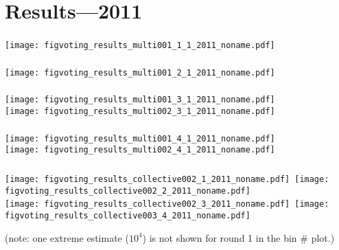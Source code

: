 \section{Results---2011}


\begin{frame}[plain]
  \frametitle{}

  \texttt{[image: figvoting\_results\_multi001\_1\_1\_2011\_noname.pdf]}\\

\end{frame}

\begin{frame}[plain]
  \frametitle{}

  \texttt{[image: figvoting\_results\_multi001\_2\_1\_2011\_noname.pdf]}\\

\end{frame}

\begin{frame}[plain]
  \frametitle{}

  \texttt{[image: figvoting\_results\_multi001\_3\_1\_2011\_noname.pdf]}\\
  \texttt{[image: figvoting\_results\_multi002\_3\_1\_2011\_noname.pdf]}

\end{frame}

\begin{frame}[plain]
  \frametitle{}

  \texttt{[image: figvoting\_results\_multi001\_4\_1\_2011\_noname.pdf]}\\
  \texttt{[image: figvoting\_results\_multi002\_4\_1\_2011\_noname.pdf]}

\end{frame}


\begin{frame}[plain]
  \frametitle{}

  \texttt{[image: figvoting\_results\_collective002\_1\_2011\_noname.pdf]}~\texttt{[image: figvoting\_results\_collective002\_2\_2011\_noname.pdf]}\\
  \texttt{[image: figvoting\_results\_collective002\_3\_2011\_noname.pdf]}~\texttt{[image: figvoting\_results\_collective003\_4\_2011\_noname.pdf]}

\tiny{(note: one extreme estimate ($10^4$) is not shown for round 1 in the bin \# plot.)}

\end{frame}


